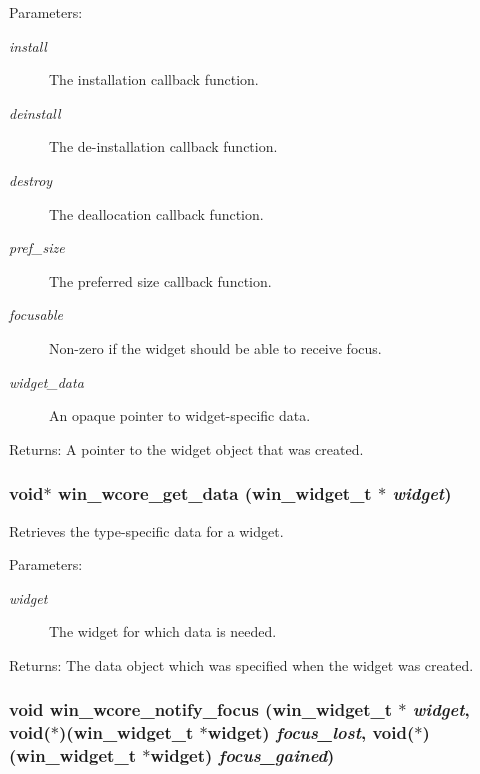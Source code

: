 \begin{Desc}
\item[Parameters:]
\begin{description}
\item[{\em install}]The installation callback function. \item[{\em deinstall}]The de-installation callback function. \item[{\em destroy}]The deallocation callback function. \item[{\em pref\_\-size}]The preferred size callback function. \item[{\em focusable}]Non-zero if the widget should be able to receive focus. \item[{\em widget\_\-data}]An opaque pointer to widget-specific data.\end{description}
\end{Desc}
\begin{Desc}
\item[Returns:]A pointer to the widget object that was created. \end{Desc}
\subsubsection{\setlength{\rightskip}{0pt plus 5cm}void$\ast$ win\_\-wcore\_\-get\_\-data ({\bf win\_\-widget\_\-t} $\ast$ {\em widget})}\label{wincore_8h_a1}


Retrieves the type-specific data for a widget. 

\begin{Desc}
\item[Parameters:]
\begin{description}
\item[{\em widget}]The widget for which data is needed. \end{description}
\end{Desc}
\begin{Desc}
\item[Returns:]The data object which was specified when the widget was created. \end{Desc}
\subsubsection{\setlength{\rightskip}{0pt plus 5cm}void win\_\-wcore\_\-notify\_\-focus ({\bf win\_\-widget\_\-t} $\ast$ {\em widget}, void($\ast$)({\bf win\_\-widget\_\-t} $\ast$widget) {\em focus\_\-lost}, void($\ast$)({\bf win\_\-widget\_\-t} $\ast$widget) {\em focus\_\-gained})}\label{wincore_8h_a4}


